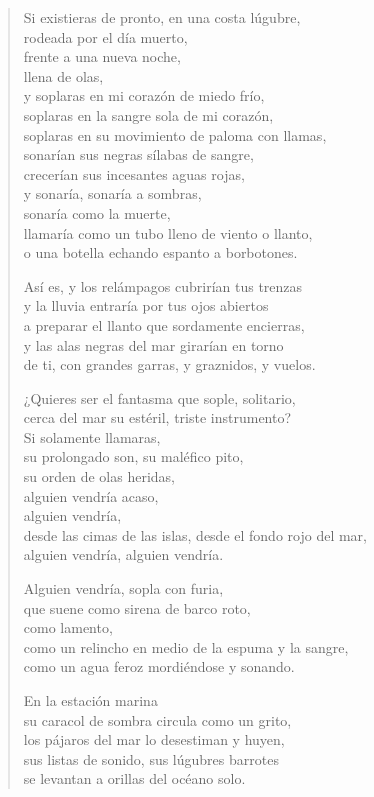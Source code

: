 \documentclass[12pt]{article}
\begin{document}
\begin{verse}
Si existieras de pronto, en una costa lúgubre,\\
rodeada por el día muerto,\\
frente a una nueva noche,\\
llena de olas,\\
y soplaras en mi corazón de miedo frío,\\
soplaras en la sangre sola de mi corazón,\\
soplaras en su movimiento de paloma con llamas,\\
sonarían sus negras sílabas de sangre,\\
crecerían sus incesantes aguas rojas,\\
y sonaría, sonaría a sombras,\\
sonaría como la muerte,\\
llamaría como un tubo lleno de viento o llanto,\\
o una botella echando espanto a borbotones.  

Así es, y los relámpagos cubrirían tus trenzas\\
y la lluvia entraría por tus ojos abiertos\\
a preparar el llanto que sordamente encierras,\\
y las alas negras del mar girarían en torno\\
de ti, con grandes garras, y graznidos, y vuelos.  

¿Quieres ser el fantasma que sople, solitario,\\
cerca del mar su estéril, triste instrumento?\\
Si solamente llamaras,\\
su prolongado son, su maléfico pito,\\
su orden de olas heridas,\\
alguien vendría acaso,\\
alguien vendría,\\
desde las cimas de las islas, desde el fondo rojo del mar,\\
alguien vendría, alguien vendría.  

Alguien vendría, sopla con furia,\\
que suene como sirena de barco roto,\\
como lamento,\\
como un relincho en medio de la espuma y la sangre,\\
como un agua feroz mordiéndose y sonando.  

En la estación marina\\
su caracol de sombra circula como un grito,\\
los pájaros del mar lo desestiman y huyen,\\
sus listas de sonido, sus lúgubres barrotes\\
se levantan a orillas del océano solo.  

\end{verse}
\end{document}
